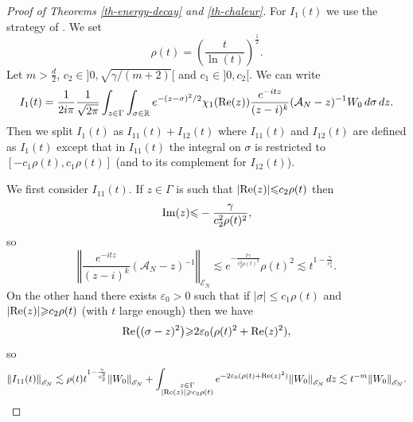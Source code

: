\documentclass[10pt, a4paper,reqno]{amsart}
\theoremstyle{plain}
\theoremstyle{definition}
\theoremstyle{remark}
\begin{document}
\begin{proof}[Proof of Theorems \ref{th-energy-decay} and \ref{th-chaleur}]
{\noindent {\bf $\bullet$}\quad } For $I_1(t)$ we use the strategy of \cite{lebeau96,Burq-Hi-07}. We set
\[
\rho(t) = \left( \frac t {\ln(t)} \right)^{\frac 12}.
\]
Let $m > \frac d 2$, $c_2 \in \big]0, \sqrt {{\gamma} /(m+2)} \big[$ and $c_1 \in ]0,c_2[$. We can write 
\[
I_1(t) = \frac 1 {2i\pi} \frac 1 {\sqrt {2\pi}} \int_{z \in {\Gamma}} \int_{\sigma \in {\mathbb{R}}} e^{-(z-\sigma)^2/2} {\chi}_1({\mathop{\rm{Re}}\nolimits}(z)) \frac {e^{-itz}}{(z -i)^k} ({{{\mathcal A}}_N}-z){^{-1}} W_0 \, d\sigma \, dz.
\]
Then we split $I_1(t)$ as $I_{11}(t) + I_{12}(t)$ where $I_{11}(t)$ and $I_{12}(t)$ are defined as $I_{1}(t)$ except that in $I_{11}(t)$ the integral on $\sigma$ is restricted to $[-c_1 \rho(t), c_1 \rho(t)]$ (and to its complement for $I_{12}(t)$). 

{\noindent {\bf $\bullet$}\quad } We first consider $I_{11}(t)$. If $z \in {\Gamma}$ is such that ${\left\vert {{\mathop{\rm{Re}}\nolimits}(z)}\right\vert} {\leqslant} c_2 \rho(t)$ then 
\[
{\mathop{\rm{Im}}\nolimits}(z) {\leqslant} - \frac {\gamma} {c_2^2 \rho(t)^2},
\]
so 
\[
{\left\Vert {\frac {e^{-itz}}{(z -i)^k} ({{{\mathcal A}}_N}-z){^{-1}}}\right\Vert}_{\mathscr E_N} \lesssim e^{- \frac {t{\gamma}}{c_2^2 \rho(t)^2}}  \rho(t)^2  \lesssim t^{1 - \frac {\gamma} {c_2^2}}.
\]
On the other hand there exists ${\varepsilon}_0 > 0$ such that if ${\left\vert {\sigma}\right\vert} {\leqslant} c_1 \rho(t)$ and ${\left\vert {{\mathop{\rm{Re}}\nolimits}(z)}\right\vert} {\geqslant} c_2 \rho(t)$ (with $t$ large enough) then we have 
\[
{\mathop{\rm{Re}}\nolimits} \big( (\sigma-z)^2 \big) {\geqslant} 2 {\varepsilon}_0 (\rho(t)^2 + {\mathop{\rm{Re}}\nolimits}(z)^2),
\]
so
\begin{equation} \label{estim-I11}
{\left\Vert {I_{11}(t)}\right\Vert}_{\mathscr E_N} \lesssim \rho(t) t^{1 - \frac {\gamma} {c_2^2}} {\left\Vert {W_0}\right\Vert}_{\mathscr E_N} + \int_{\substack {z \in {\Gamma} \\{\left\vert {{\mathop{\rm{Re}}\nolimits}(z)}\right\vert} {\geqslant} c_2 \rho(t)}} e^{-2{\varepsilon}_0(\rho(t) + {\mathop{\rm{Re}}\nolimits}(z)^2)} {\left\Vert {W_0}\right\Vert}_{\mathscr E_N} \, dz  \lesssim t^{-m} {\left\Vert {W_0}\right\Vert}_{\mathscr E_N}.
\end{equation}


\end{proof}
\end{document}
